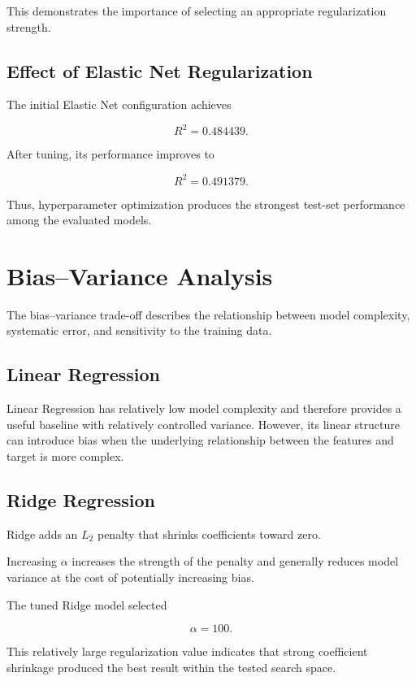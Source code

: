 \documentclass[12pt,a4paper]{article}
\begin{document}
This demonstrates the importance of selecting an appropriate
regularization strength.

\subsection{Effect of Elastic Net Regularization}

The initial Elastic Net configuration achieves

\[
R^2=0.484439.
\]

After tuning, its performance improves to

\[
R^2=0.491379.
\]

Thus, hyperparameter optimization produces the strongest test-set
performance among the evaluated models.


\section{Bias--Variance Analysis}

The bias--variance trade-off describes the relationship between model
complexity, systematic error, and sensitivity to the training data.

\subsection{Linear Regression}

Linear Regression has relatively low model complexity and therefore
provides a useful baseline with relatively controlled variance. However,
its linear structure can introduce bias when the underlying relationship
between the features and target is more complex.

\subsection{Ridge Regression}

Ridge adds an $L_2$ penalty that shrinks coefficients toward zero.

Increasing $\alpha$ increases the strength of the penalty and generally
reduces model variance at the cost of potentially increasing bias.

The tuned Ridge model selected

\[
\alpha=100.
\]

This relatively large regularization value indicates that strong
coefficient shrinkage produced the best result within the tested search
space.
\end{document}
